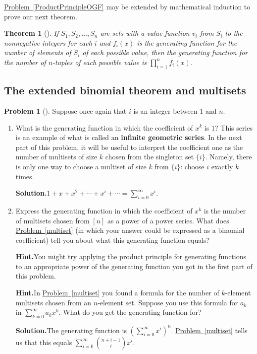 \documentclass[10pt,]{book}
\newcommand{\terminology}[1]{\textbf{#1}}
\theoremstyle{plain}
\newtheorem{theorem}{Theorem}[section]
\theoremstyle{definition}
\newtheorem{activity}[project]{Problem}
\theoremstyle{definition}
\numberwithin{equation}{chapter}
\begin{document}
\hyperref[ProductPrincipleOGF]{Problem~\ref{ProductPrincipleOGF}} may be extended by mathematical induction to prove our next theorem.%
\begin{theorem}[{}]\label{theorem-7}
If \(S_1,S_2,\dots,S_n\) are sets with a value function \(v_i\) from \(S_i\) to the nonnegative integers for each \(i\) and \(f_i(x)\) is the generating function for the number of elements of \(S_i\) of each possible value, then the generating function for the number of \(n\)-tuples of each possible value is \(\prod_{i=1}^n f_i(x)\).%
\end{theorem}
\typeout{************************************************}
\typeout{************************************************}
\subsection[{The extended binomial theorem and multisets}]{The extended binomial theorem and multisets}\label{subsection-38}
\begin{activity}[]\label{activity-192}
Suppose once again that \(i\) is an integer between 1 and \(n\).%
\begin{enumerate}[font=\bfseries,label=(\alph*),ref=\alph*]
\item\label{task-127} What is the generating function in which the coefficient of \(x^k\) is \(1\)? This series is an example of what is called an \terminology{infinite geometric series}. In the next part of this problem, it will be useful to interpret the coefficient one as the number of multisets of size \(k\) chosen from the singleton set \(\{i\}\). Namely, there is only one way to choose a multiset of size \(k\) from \(\{i\}\): choose \(i\) exactly \(k\) times.%
\par\medskip\noindent%
\textbf{Solution.}\quad \(1+x+x^2+\cdots+x^i+\cdots=\sum_{i=0}^\infty x^i\).%
\item\label{task-128} Express the generating function in which the coefficient of \(x^k\) is the number of multisets chosen from \([n]\) as a power of a power series.  What does \hyperref[multiset]{Problem~\ref{multiset}} (in which your answer could be expressed as a binomial coefficient) tell you about what this generating function equals?%
\par\medskip\noindent%
\textbf{Hint.}\quad You might try applying the product principle for generating functions to an appropriate power of the generating function you got in the first part of this problem.%
\par\medskip\noindent%
\textbf{Hint.}\quad In \hyperref[multiset]{Problem~\ref{multiset}} you found a formula for the number of \(k\)-element multisets chosen from an \(n\)-element set. Suppose you use this formula for \(a_k\) in \(\sum_{k=0}^\infty a_kx^k\). What do you get the generating function for?%
\par\medskip\noindent%
\textbf{Solution.}\quad The generating function is \(\left(\sum_{i=0}^\infty x^i\right)^n\).  \hyperref[multiset]{Problem~\ref{multiset}} tells us that this equals \(\sum_{i=0}^\infty\binom{n+i-1}{i}x^i\).%
\end{enumerate}
\end{activity}
\end{document}
